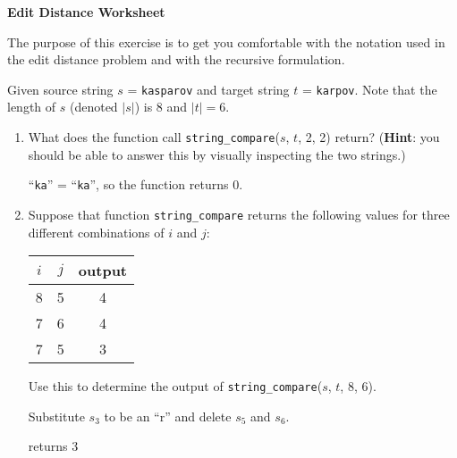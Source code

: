 \documentclass[12pt]{article}
\begin{document}
\newcommand{\I}{\mbox{{\em Int}}}
\newcommand{\lt}{\mbox{{\em left}}}
\newcommand{\rt}{\mbox{{\em right}}}
\newcommand{\ld}{\Delta^l}
\newcommand{\rd}{\Delta^r}
\newcommand{\lsp}[1]{\large\renewcommand{\baselinestretch}{#1}\normalsize}
\newcommand{\hsp}{\hspace{.2in}}

\def\Endwhile{\mbox{\bf endwhile\ }}
\def\Or{\mbox{\bf or\ }}
\def\Do{\mbox{\bf do\ }}
\def\Downto{\mbox{\bf downto\ }}
\def\Int{\mbox{\bf int\ }}
\def\To{\mbox{\bf to\ }}
\def\Repeat{\mbox{\bf repeat\ }}
\def\Until{\mbox{\bf until\ }}
\def\Return{\mbox{\bf return\ }}
\def\Not{\mbox{\bf not\ }}
\def\And{\mbox{\bf and\ }}
\def\For{\mbox{\bf for\ }}
\def\Foreach{\mbox{\bf foreach\ }}
\def\Else{\mbox{\bf else\ }}
\def\Elseif{\mbox{\bf elseif\ }}
\def\End{\mbox{\bf end\ }}
\def\If{\mbox{\bf if\ }}
\def\Mod{\mbox{\bf \ mod\ }}
\def\Then{\mbox{\bf then\ }}
\def\While{\mbox{\bf while\ }}
\def\Output{\mbox{\bf output\ }}


\lsp{1}
\pagestyle{plain}
\begin{center}
{\bf
Edit Distance Worksheet
}
\end{center}

The purpose of this exercise is to get you comfortable with
the notation used in the edit distance problem and with the
recursive formulation.

Given source string $s$ = {\tt kasparov} and target string 
$t$  = {\tt karpov}. Note that the length of $s$ (denoted $|s|$) 
is 8 and $|t| = 6$. 

\begin{enumerate}
\item What does the function call {\tt string\_compare}($s$, $t$, 2, 2)
return? ({\bf Hint}: you should be able to answer this by visually 
inspecting the two strings.)
\vspace*{.25in}

``\texttt{ka}'' = ``\texttt{ka}'', so the function returns 0.

\vspace{1in}

\item Suppose that function {\tt string\_compare} returns the following
values for three different combinations of $i$ and $j$:

\begin{center}
\begin{tabular}{|c|c|c|} \hline
$i$ & $j$ & output \\ \hline
8 & 5 & 4 \\ \hline
7 & 6 & 4 \\ \hline
7 & 5 & 3 \\ \hline
\end{tabular} 
\end{center}

Use this to determine the output of {\tt string\_compare}($s$, $t$, 8, 6).

\vspace{.25in}
Substitute $s_3$ to be an ``r'' and delete $s_5$ and $s_6$.

returns 3
\end{enumerate}
\end{document}
